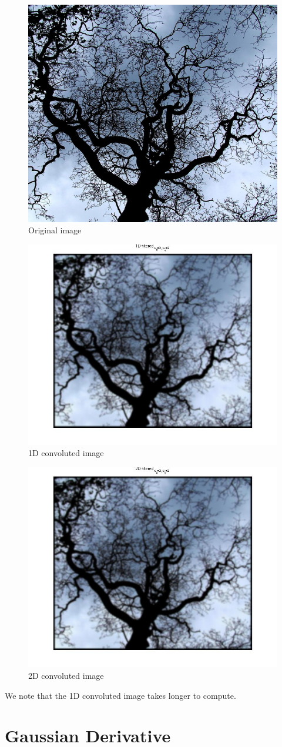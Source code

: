 \documentclass[11pt]{article}
\begin{document}
\begin{figure}[H]
	\centering
	\includegraphics[width=.8\textwidth]{imgs/branches.jpg}
	\caption{Original image}
	\label{fig:original}
\end{figure}

\begin{figure}[H]
	\centering
	\includegraphics[width=.8\textwidth]{imgs/1D_branches.jpg}
	\caption{1D convoluted image}
	\label{fig:1D}
\end{figure}

\begin{figure}[H]
	\centering
	\includegraphics[width=.8\textwidth]{imgs/2D_branches.jpg}
	\caption{2D convoluted image}
	\label{fig:2D}
\end{figure}

We note that the 1D convoluted image takes longer to compute. 

\section{Gaussian Derivative}
\end{document}
